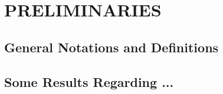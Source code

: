 \chapter{PRELIMINARIES}


\section{General Notations and Definitions}

\section{Some Results Regarding ...}

